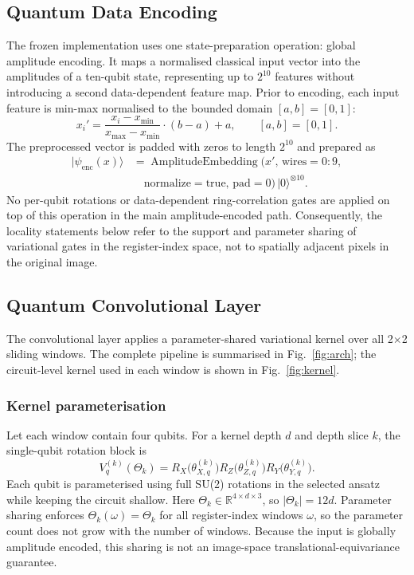 \documentclass[conference]{IEEEtran}
\begin{document}
\subsection{Quantum Data Encoding}
The frozen implementation uses one state-preparation operation: global amplitude encoding. It maps a normalised classical input vector into the amplitudes of a ten-qubit state, representing up to $2^{10}$ features without introducing a second data-dependent feature map. Prior to encoding, each input feature is min-max normalised to the bounded domain $[a, b] = [0, 1]$:
\begin{equation}
x_i' = \frac{x_i - x_{\min}}{x_{\max} - x_{\min}} \cdot (b - a) + a, \qquad [a, b] = [0, 1].
\end{equation}
The preprocessed vector is padded with zeros to length $2^{10}$ and prepared as
\begin{equation}
\begin{aligned}
|\psi_{\mathrm{enc}}(x)\rangle
 &= \operatorname{AmplitudeEmbedding}(x',\,\mathrm{wires}=0{:}9,\\
 &\quad \mathrm{normalize}=\mathrm{true},\,\mathrm{pad}=0)\,|0\rangle^{\otimes 10}.
\end{aligned}
\end{equation}
No per-qubit rotations or data-dependent ring-correlation gates are applied on top of this operation in the main amplitude-encoded path. Consequently, the locality statements below refer to the support and parameter sharing of variational gates in the register-index space, not to spatially adjacent pixels in the original image.

\subsection{Quantum Convolutional Layer}
The convolutional layer applies a parameter-shared variational kernel over all 2$\times$2 sliding windows. The complete pipeline is summarised in Fig.~\ref{fig:arch}; the circuit-level kernel used in each window is shown in Fig.~\ref{fig:kernel}.

\subsubsection{Kernel parameterisation}
Let each window contain four qubits. For a kernel depth $d$ and depth slice $k$, the single-qubit rotation block is
\begin{equation}
V_q^{(k)}(\Theta_k) = R_X\!\big(\theta_{X,q}^{(k)}\big) R_Z\!\big(\theta_{Z,q}^{(k)}\big) R_Y\!\big(\theta_{Y,q}^{(k)}\big).
\end{equation}
Each qubit is parameterised using full SU(2) rotations in the selected ansatz while keeping the circuit shallow. Here $\Theta_k \in \mathbb{R}^{4 \times d \times 3}$, so $|\Theta_k| = 12d$. Parameter sharing enforces $\Theta_k(\omega) = \Theta_k$ for all register-index windows $\omega$, so the parameter count does not grow with the number of windows. Because the input is globally amplitude encoded, this sharing is not an image-space translational-equivariance guarantee.
\end{document}
